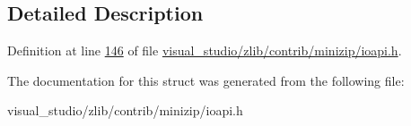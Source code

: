 \subsection{Detailed Description}


Definition at line \hyperlink{visual__studio_2zlib_2contrib_2minizip_2ioapi_8h_source_l00146}{146} of file \hyperlink{visual__studio_2zlib_2contrib_2minizip_2ioapi_8h_source}{visual\+\_\+studio/zlib/contrib/minizip/ioapi.\+h}.



The documentation for this struct was generated from the following file\+:\begin{DoxyCompactItemize}
\item 
visual\+\_\+studio/zlib/contrib/minizip/ioapi.\+h\end{DoxyCompactItemize}
